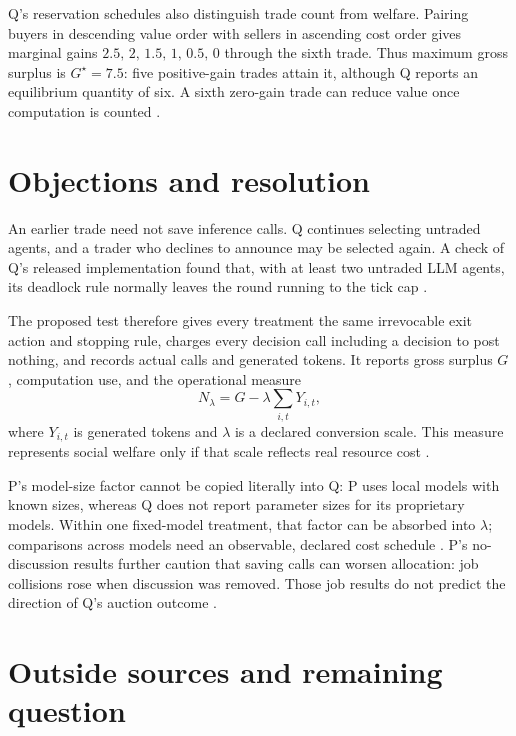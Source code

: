 \documentclass{article}
\begin{document}
Q's reservation schedules also distinguish trade count from welfare. Pairing buyers in descending value order with sellers in ascending cost order gives marginal gains \(2.5,\,2,\,1.5,\,1,\,0.5,\,0\) through the sixth trade. Thus maximum gross surplus is \(G^\star=7.5\): five positive-gain trades attain it, although Q reports an equilibrium quantity of six. A sixth zero-gain trade can reduce value once computation is counted .

\section*{Objections and resolution}

\begin{objection}
An earlier trade need not save inference calls. Q continues selecting untraded agents, and a trader who declines to announce may be selected again. A check of Q's released implementation found that, with at least two untraded LLM agents, its deadlock rule normally leaves the round running to the tick cap .
\end{objection}

The proposed test therefore gives every treatment the same irrevocable exit action and stopping rule, charges every decision call including a decision to post nothing, and records actual calls and generated tokens. It reports gross surplus \(G\), computation use, and the operational measure
\[
N_{\lambda}=G-\lambda\sum_{i,t}Y_{i,t},
\]
where \(Y_{i,t}\) is generated tokens and \(\lambda\) is a declared conversion scale. This measure represents social welfare only if that scale reflects real resource cost .

P's model-size factor cannot be copied literally into Q: P uses local models with known sizes, whereas Q does not report parameter sizes for its proprietary models. Within one fixed-model treatment, that factor can be absorbed into \(\lambda\); comparisons across models need an observable, declared cost schedule . P's no-discussion results further caution that saving calls can worsen allocation: job collisions rose when discussion was removed. Those job results do not predict the direction of Q's auction outcome .

\section*{Outside sources and remaining question}
\end{document}
